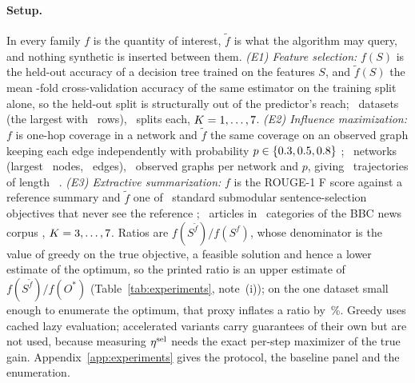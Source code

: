 \paragraph{Setup.}
In every family $f$ is the quantity of interest, $\tilde f$ is what the
algorithm may query, and nothing synthetic is inserted between them.
\emph{(E1) Feature selection:} $f(S)$ is the held-out accuracy of a decision
tree trained on the features $S$, and $\tilde f(S)$ the mean
\EOneCVFolds-fold cross-validation accuracy of the same estimator on the
training split alone, so the held-out split is structurally out of the
predictor's reach; \EOneNumDatasets\ datasets (the largest with
\EOneAirlineRows\ rows), \EOneNumSeeds\ splits each,
$K=1,\dots,7$.
\emph{(E2) Influence maximization:} $f$ is one-hop coverage in a network and
$\tilde f$ the same coverage on an observed graph keeping each edge
independently with probability $p\in\{0.3, 0.5, 0.8\}$
\citep{kempe2003maximizing}; \ETwoNumGraphs\ networks (largest
\ETwoLargestNodes\ nodes, \ETwoLargestEdges\ edges), \ETwoNumSeedsPerP\
observed graphs per network and $p$, giving \ETwoNumTrajectories\
trajectories of length \ETwoKMain\
\citep{rozemberczki2019gemsec,leskovec2007graph,yin2017local}.
\emph{(E3) Extractive summarization:} $f$ is the ROUGE-1 F score against a
reference summary and $\tilde f$ one of \EThreeNumSurrogates\ standard
submodular sentence-selection objectives that never see the reference
\citep{lin2011class}; \EThreeNumDocs\ articles in \EThreeNumCategories\
categories of the {BBC} news corpus \citep{greene2006practical},
$K=3,\dots,7$.  Ratios are
$f(S^{\tilde f})/f(S^{f})$, whose denominator is the value of greedy on the
true objective, a feasible solution and hence a lower estimate of the
optimum, so the printed ratio is an upper estimate of
$f(S^{\tilde f})/f(O^{\ast})$
(Table~\ref{tab:experiments}, note~(i)); on the one dataset small enough to
enumerate the optimum, that proxy inflates a ratio by
\EOneBreastOptInflationPct\,\%.  Greedy uses cached lazy evaluation;
accelerated variants carry guarantees of their own
\citep{mirzasoleiman2015lazier} but are not used, because measuring $\eta^{\mathrm{sel}}$
needs the exact per-step maximizer of the true gain.
Appendix~\ref{app:experiments} gives the protocol, the baseline panel and the
enumeration.

